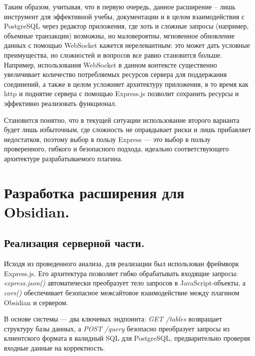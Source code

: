 \documentclass[14pt]{extarticle}
\begin{document}
	Таким образом, учитывая, что в первую очередь, данное расширение – лишь инструмент для эффективной учебы, документации и в целом взаимодействия с PostgreSQL через редактор приложения, где хоть и сложные запросы (например, объемные транзакции) возможны, но маловероятны, мгновенное обновление данных с помощью WebSocket кажется нерелевантным: это может дать условные преимущества, но сложностей и вопросов все равно становится больше. Например, использования WebSocket в данном контексте существенно увеличивает количество потребляемых ресурсов сервера для поддержания соединений, а также в целом усложняет архитектуру приложения, в то время как http и поднятие сервера с помощью Express.js позволит сохранить ресурсы и эффективно реализовать функционал.
	
	Становится понятно, что в текущей ситуации использование второго варианта
	будет лишь избыточным, где сложность не оправдывает риски и лишь прибавляет недостатков, поэтому выбор в пользу Express — это выбор в пользу
	проверенного, гибкого и безопасного подхода, идеально соответствующего архитектуре разрабатываемого плагина.
	
	
	\newpage
	\section{Разработка расширения для Obsidian.}
	\subsection{Реализация серверной части.}
	\vspace{1em}
	Исходя из проведенного анализа, для реализации был использован фреймворк Express.js. Его архитектура позволяет гибко обрабатывать
	входящие запросы: \textit{express.json() }автоматически преобразует тело запросов в
	JavaScript-объекты, а \textit{cors()} обеспечивает безопасное межсайтовое взаимодействие между плагином Obsidian и сервером.
	\vspace{1em}
	
	В основе системы — два ключевых эндпоинта: \textit{GET /tables} возвращает структуру базы данных, а \textit{POST /query} безопасно преобразует запросы из клиентского формата в валидный SQL для PostgreSQL, предварительно проверяя входные данные на корректность.
	\vspace{1em}
	
\end{document}
